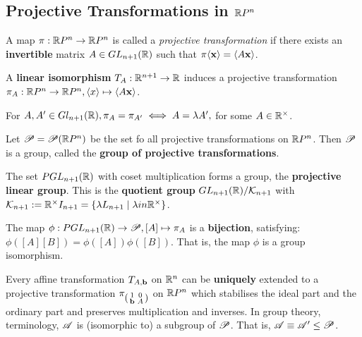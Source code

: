 \subsection{Projective Transformations in \(\mathbb{R} P^n\)}

\begin{definition}
    A map \(\pi : \mathbb{R} P^n \to \mathbb{R} P^n\) is called a \textit{projective transformation} if there exists an \textbf{invertible} matrix \(A \in GL_{n + 1} (\mathbb{R})\) such that \(\pi\langle \mathbf{x} \rangle = \langle A\mathbf{x} \rangle\).
\end{definition}

\begin{proposition}
    \begin{statements}{}
        \item A \textbf{linear isomorphism} \(T_A : \mathbb{R}^{n + 1} \to \mathbb{R}\) induces a projective transformation \(\pi_A : \mathbb{R} P^n \to \mathbb{R} P^n, \langle x \rangle \mapsto \langle A\mathbf{x} \rangle\).
        \item For \(A, A' \in Gl_{n + 1}(\mathbb{R}), \pi_A = \pi_{A'} \iff A = \lambda A',\) for some \(A \in \mathbb{R}^\times\).
    \end{statements}
\end{proposition}

\begin{theorem}
    Let \(\mathscr{P} = \mathscr{P}(\mathbb{R} P^n)\) be the set fo all projective transformations on \(\mathbb{R} P^n\). Then \(\mathscr{P}\) is a group, called the \textbf{group of projective transformations}.
\end{theorem}

\begin{theorem}
    \begin{statements}{}
        \item The set \(PGL_{n+1}(\mathbb{R})\) with coset multiplication forms a group, the \textbf{projective linear group}. This is the \textbf{quotient group} \(GL_{n + 1}(\mathbb{R}) / \mathcal{K}_{n + 1}\) with \(\mathcal{K}_{n + 1} := \mathbb{R}^\times I_{n + 1} = \{ \lambda L_{n + 1} \mid \lambda in \mathbb{R}^\times \}\).
        \item The map \(\phi : PGL_{n + 1}(\mathbb{R}) \to \mathscr{P}, [A] \mapsto \pi_A\) is a \textbf{bijection}, satisfying: \(\phi([A][B]) = \phi([A])\phi([B])\). That is, the map \(\phi\) is a group isomorphism.
    \end{statements}
\end{theorem}

\begin{theorem}
    Every affine transformation \(T_{A, \mathbf{b}}\) on \(\mathbb{R}^n\) can be \textbf{uniquely} extended to a projective transformation \(\pi_{\left(\begin{smallmatrix} 1 & 0 \\ \mathbf{b} & A \end{smallmatrix}\right)}\) on \(\mathbb{R} P^n\) which stabilises the ideal part and the ordinary part and preserves multiplication and inverses. In group theory, terminology, \(\mathscr{A}\) is (isomorphic to) a subgroup of \(\mathscr{P}\). That is, \(\mathscr{A} \equiv \mathscr{A}' \leq \mathscr{P}\).
\end{theorem}

\pagebreak